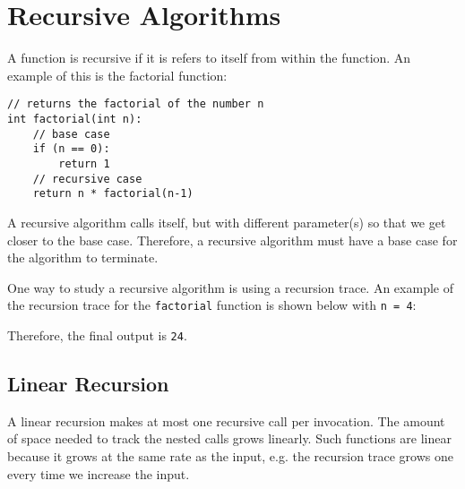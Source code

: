 \documentclass[a4paper, openany]{memoir}
\begin{document}
\section{Recursive Algorithms}
A function is recursive if it is refers to itself from within the function. An example of this is the factorial function:
\begin{lstlisting}[language=pseudocode]
// returns the factorial of the number n
int factorial(int n):
    // base case
    if (n == 0):
        return 1
    // recursive case
    return n * factorial(n-1)
\end{lstlisting}
A recursive algorithm calls itself, but with different parameter(s) so that we get closer to the base case. Therefore, a recursive algorithm must have a base case for the algorithm to terminate.

\noindent One way to study a recursive algorithm is using a recursion trace. An example of the recursion trace for the \texttt{factorial} function is shown below with \texttt{n = 4}:
\begin{center}
\end{center}
Therefore, the final output is \texttt{24}.

\subsection{Linear Recursion}
A linear recursion makes at most one recursive call per invocation. The amount of space needed to track the nested calls grows linearly. Such functions are linear because it grows at the same rate as the input, e.g. the recursion trace grows one every time we increase the input.
\end{document}
